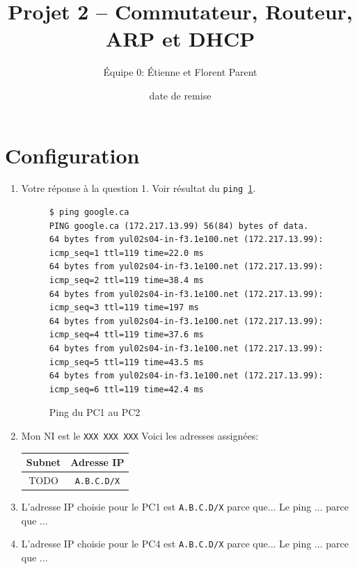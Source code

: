 \documentclass[]{article}
\title{Projet 2 -- Commutateur, Routeur, ARP et DHCP}
\author{Équipe 0: Étienne et Florent Parent} %
\date{date de remise} %
\begin{document}
\maketitle

\section*{Configuration}

\begin{enumerate}

    \item Votre réponse à la question 1. Voir résultat du \texttt{ping}~\ref{fig:ping-pc1-pc2}.

    \begin{figure} 
        \centering
        \begin{lstlisting}
$ ping google.ca
PING google.ca (172.217.13.99) 56(84) bytes of data.
64 bytes from yul02s04-in-f3.1e100.net (172.217.13.99): icmp_seq=1 ttl=119 time=22.0 ms
64 bytes from yul02s04-in-f3.1e100.net (172.217.13.99): icmp_seq=2 ttl=119 time=38.4 ms
64 bytes from yul02s04-in-f3.1e100.net (172.217.13.99): icmp_seq=3 ttl=119 time=197 ms
64 bytes from yul02s04-in-f3.1e100.net (172.217.13.99): icmp_seq=4 ttl=119 time=37.6 ms
64 bytes from yul02s04-in-f3.1e100.net (172.217.13.99): icmp_seq=5 ttl=119 time=43.5 ms
64 bytes from yul02s04-in-f3.1e100.net (172.217.13.99): icmp_seq=6 ttl=119 time=42.4 ms
        \end{lstlisting}
        \caption[]{Ping du PC1 au PC2}
        \label{fig:ping-pc1-pc2}
    \end{figure}

    \item Mon NI est le \texttt{XXX XXX XXX} Voici les adresses assignées:
    
    \begin{center}
        \begin{tabular}{|c|c|}
            \hline
            \textbf{Subnet} & \textbf{Adresse IP} \\
            \hline
            TODO & \texttt{A.B.C.D/X} \\
            \hline
        \end{tabular}
    \end{center}

    \item L'adresse IP choisie pour le PC1 est \texttt{A.B.C.D/X} parce que... Le ping ...
          parce que ...
    \item L'adresse IP choisie pour le PC4 est \texttt{A.B.C.D/X} parce que... Le ping ...
          parce que ...

\end{enumerate}
\end{document}
